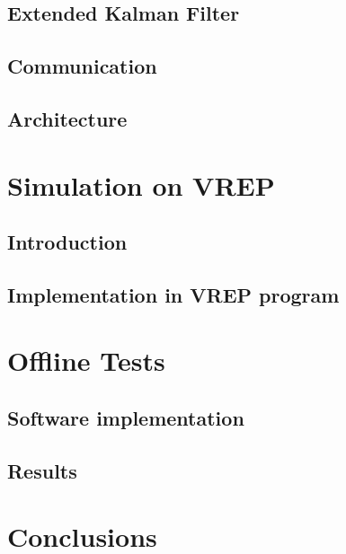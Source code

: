 \documentclass[11pt, oneside]{book} %
\begin{document}
\section{Extended Kalman Filter}


\newpage
\section{Communication}


\section{Architecture} \label{sec:SoftArch}



\chapter{Simulation on VREP}
\section{Introduction}


\section{Implementation in VREP program}


\chapter{Offline Tests}
\section{Software implementation}


\section{Results}



\chapter{Conclusions} \label{chap:c6_conclusions}

\end{document}
